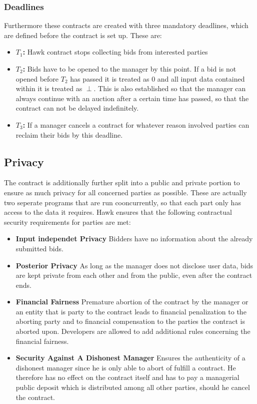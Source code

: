 \subsubsection{Deadlines}
Furthermore these contracts are created with three mandatory deadlines, which are defined before the contract is set up. These are:\cite[p.841]{Hawk}
\begin{itemize}
\item \textbf{$T_1$:} Hawk contract stops collecting bids from interested parties
\item \textbf{$T_2$:} Bids have to be opened to the manager by this point. If a bid is not opened before $T_2$ has passed it is treated as 0 and all input data contained within it is treated as $\perp$. This is also established so that the manager can always continue with an auction after a certain time has passed, so that the contract can not be delayed indefinitely.
\item \textbf{$T_3$:} If a manager cancels a contract for whatever reason involved parties can reclaim their bids by this deadline.
\end{itemize}

\subsection{Privacy}
The contract is additionally further split into a public and private portion to ensure as much privacy for all concerned parties as possible. These are actually two seperate programs that are run cooncurrently, so that each part only has access to the data it requires.
Hawk ensures that the following contractual security requirements for parties are met:\cite[p.841]{Hawk}
\begin{itemize}
\item \textbf{Input independet Privacy}
Bidders have no information about the already submitted bids.
\item \textbf{Posterior Privacy}
As long as the manager does not disclose user data, bids are kept private from each other and from the public, even after the contract ends.
\item \textbf{Financial Fairness}
Premature abortion of the contract by the manager or an entity that is party to the contract leads to financial penalization to the aborting party and to financial compensation to the parties the contract is aborted upon. Developers are allowed to add additional rules concerning the financial fairness.
\item \textbf{Security Against A Dishonest Manager}
Ensures the authenticity of a dishonest manager since he is only able to abort of fulfill a contract. He therefore has no effect on the contract itself and has to pay a managerial public deposit which is distributed among all other parties, should he cancel the contract.
\end{itemize}

